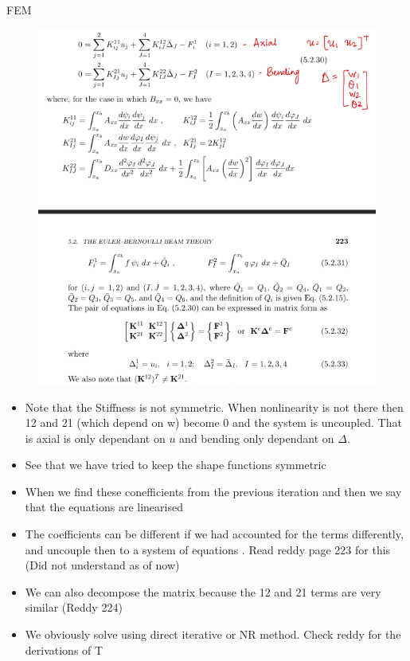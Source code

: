 	\begin{frame}{FEM}
		\begin{figure}
			\centering
			\includegraphics[width=0.66 \linewidth]{Figure/fig21} 		
		\end{figure}
	\end{frame}


	\begin{frame}
		\begin{itemize}
			\item Note that the Stiffness is not symmetric. When nonlinearity is not there then 12 and 21 (which depend on w) become 0 and the system is uncoupled. That is axial is only dependant on $u$ and bending only dependant on $\Delta$.
			\item See that we have tried to keep the shape functions symmetric
			\item When we find these conefficients from the previous iteration and then we say that the equations are linearised
			\item  The coefficients can be different if we had accounted for the terms differently, and uncouple then to a system of equations . Read reddy page 223 for this (Did not understand as of now)
			\item  We can also decompose the matrix because the 12 and 21 terms are very similar (Reddy 224)
			\item We obviously solve using direct iterative or NR method. Check reddy for the derivations of T 
		\end{itemize}
	\end{frame}


